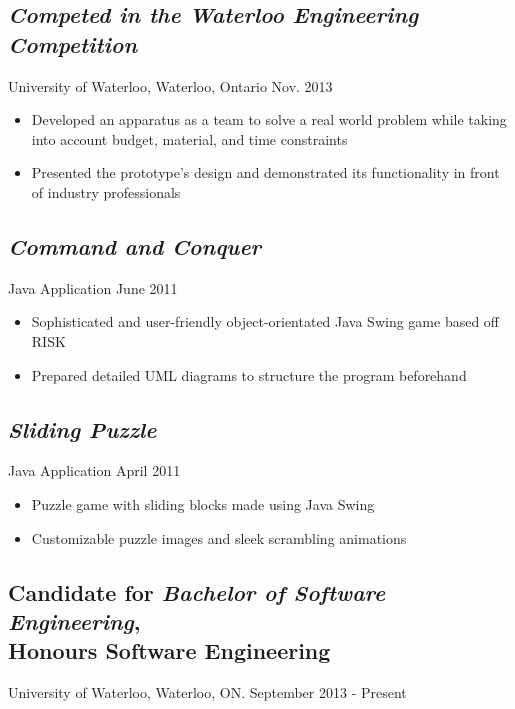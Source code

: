 \documentclass[10pt]{article}
\begin{document}
\begin{minipage}[t]{0.84\linewidth}
	\subsection*{\textit{Competed in the Waterloo Engineering Competition}} \vspace{-6pt} 
		University of Waterloo, Waterloo, Ontario \hspace{160pt} Nov. 2013
		\begin{itemize}
			\item Developed an apparatus as a team to solve a real world problem while taking into account budget, 				material, and time constraints
			\item Presented the prototype's design and demonstrated its functionality in front of industry 								professionals
		\end{itemize}	
	
	\subsection*{\textit{Command and Conquer}} \vspace{-6pt}
		Java Application \hspace{270pt} June 2011
		\begin{itemize}
			\item Sophisticated and user-friendly object-orientated Java Swing game based off RISK
			\item Prepared detailed UML diagrams to structure the program beforehand
		\end{itemize}

	\subsection*{\textit{Sliding Puzzle}} \vspace{-6pt}
		Java Application \hspace{270pt} April 2011
		\begin{itemize}
			\item Puzzle game with sliding blocks made using Java Swing
			\item Customizable puzzle images and sleek scrambling animations
		\end{itemize}
	
	\subsection*{Candidate for \textit{Bachelor of Software Engineering}, \\ Honours Software Engineering} 								\vspace{-6pt}
		University of Waterloo, Waterloo, ON. \hspace{100pt} September 2013 - Present
\end{minipage}
\end{document}
